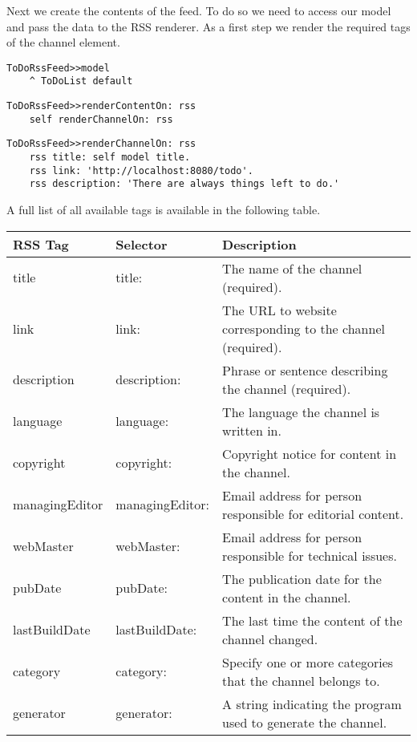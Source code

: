 \documentclass[a4paper,10pt,twoside]{book}
\newcommand{\ct}[1]{{\small\ttfamily\textup{#1}}}
\begin{document}
Next we create the contents of the feed. To do so we need to access our model and pass the data to the RSS renderer. As a first step we render the required tags of the channel element.

\begin{lstlisting}
ToDoRssFeed>>model
    ^ ToDoList default
\end{lstlisting}

\begin{lstlisting}
ToDoRssFeed>>renderContentOn: rss
    self renderChannelOn: rss
\end{lstlisting}

\begin{lstlisting}
ToDoRssFeed>>renderChannelOn: rss
    rss title: self model title.
    rss link: 'http://localhost:8080/todo'.
    rss description: 'There are always things left to do.'
\end{lstlisting}

A full list of all available tags is available in the following table.

\begin{tabularx}{\textwidth}{llX}
\textbf{RSS Tag }&\textbf{Selector }&\textbf{Description}\\ \hline
 \ct{title} & \index{RRRssRenderCanvas!title} \ct{title:} & The name of the channel (required).\\
 \ct{link} & \index{RRRssRenderCanvas!link} \ct{link:} & The URL to website corresponding to the channel (required).\\
 \ct{description} & \index{RRRssRenderCanvas!description} \ct{description:} & Phrase or sentence describing the channel (required).\\
 \ct{language} & \index{RRRssRenderCanvas!language} \ct{language:} & The language the channel is written in.\\
 \ct{copyright} & \index{RRRssRenderCanvas!copyright} \ct{copyright:} & Copyright notice for content in the channel.\\
 \ct{managingEditor} & \index{RRRssRenderCanvas!managingEditor} \ct{managingEditor:} & Email address for person responsible for editorial content.\\
 \ct{webMaster} & \index{RRRssRenderCanvas!webMaster} \ct{webMaster:} & Email address for person responsible for technical issues.\\
 \ct{pubDate} & \index{RRRssRenderCanvas!pubDate} \ct{pubDate:} & The publication date for the content in the channel.\\
 \ct{lastBuildDate} & \index{RRRssRenderCanvas!lastBuildDate} \ct{lastBuildDate:} & The last time the content of the channel changed.\\
 \ct{category} & \index{RRRssRenderCanvas!category} \ct{category:} & Specify one or more categories that the channel belongs to.\\
 \ct{generator} & \index{RRRssRenderCanvas!generator} \ct{generator:} & A string indicating the program used to generate the channel.\\
\end{tabularx}
\end{document}
